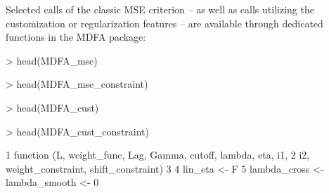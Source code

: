 \documentclass[a4paper]{book}
\begin{document}
Selected calls of the classic MSE  criterion -- as well as calls utilizing the customization or regularization features --
 are available through dedicated functions in the MDFA package: 
\begin{Schunk}
\begin{Sinput}
> head(MDFA_mse)
\end{Sinput}
\begin{Soutput}
1 function (L, weight_func, Lag, Gamma) 
2 {                                     
3     cutoff <- pi                      
4     lin_eta <- F                      
5     lambda <- 0                       
6     eta <- 0                          
\end{Soutput}
\begin{Sinput}
> head(MDFA_mse_constraint)
\end{Sinput}
\begin{Soutput}
1 function (L, weight_func, Lag, Gamma, i1, i2, weight_constraint, 
2     shift_constraint)                                            
3 {                                                                
4     cutoff <- pi                                                 
5     lin_eta <- F                                                 
6     lambda <- 0                                                  
\end{Soutput}
\begin{Sinput}
> head(MDFA_cust)
\end{Sinput}
\begin{Soutput}
1 function (L, weight_func, Lag, Gamma, cutoff, lambda, eta)                  
2 {                                                                           
3     lin_eta <- F                                                            
4     weight_constraint <- rep(1/(ncol(weight_func) - 1), ncol(weight_func) - 
5         1)                                                                  
6     lambda_cross <- lambda_smooth <- 0                                      
\end{Soutput}
\begin{Sinput}
> head(MDFA_cust_constraint)
\end{Sinput}
\begin{Soutput}
1 function (L, weight_func, Lag, Gamma, cutoff, lambda, eta, i1, 
2     i2, weight_constraint, shift_constraint)                   
3 {                                                              
4     lin_eta <- F                                               
5     lambda_cross <- lambda_smooth <- 0                         
}
\end{Soutput}
\end{Schunk}
\end{document}
